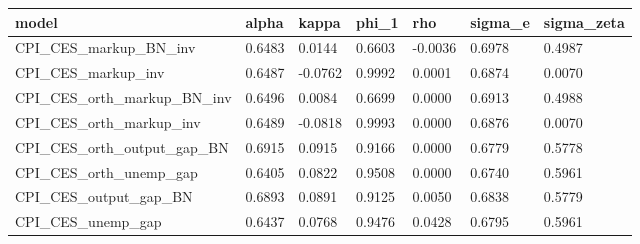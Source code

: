 \begin{tabular}{lllllll}
\toprule
model & alpha & kappa & phi_1 & rho & sigma_e & sigma_zeta \\
\midrule
CPI_CES_markup_BN_inv & 0.6483 & 0.0144 & 0.6603 & -0.0036 & 0.6978 & 0.4987 \\
CPI_CES_markup_inv & 0.6487 & -0.0762 & 0.9992 & 0.0001 & 0.6874 & 0.0070 \\
CPI_CES_orth_markup_BN_inv & 0.6496 & 0.0084 & 0.6699 & 0.0000 & 0.6913 & 0.4988 \\
CPI_CES_orth_markup_inv & 0.6489 & -0.0818 & 0.9993 & 0.0000 & 0.6876 & 0.0070 \\
CPI_CES_orth_output_gap_BN & 0.6915 & 0.0915 & 0.9166 & 0.0000 & 0.6779 & 0.5778 \\
CPI_CES_orth_unemp_gap & 0.6405 & 0.0822 & 0.9508 & 0.0000 & 0.6740 & 0.5961 \\
CPI_CES_output_gap_BN & 0.6893 & 0.0891 & 0.9125 & 0.0050 & 0.6838 & 0.5779 \\
CPI_CES_unemp_gap & 0.6437 & 0.0768 & 0.9476 & 0.0428 & 0.6795 & 0.5961 \\
\bottomrule
\end{tabular}
